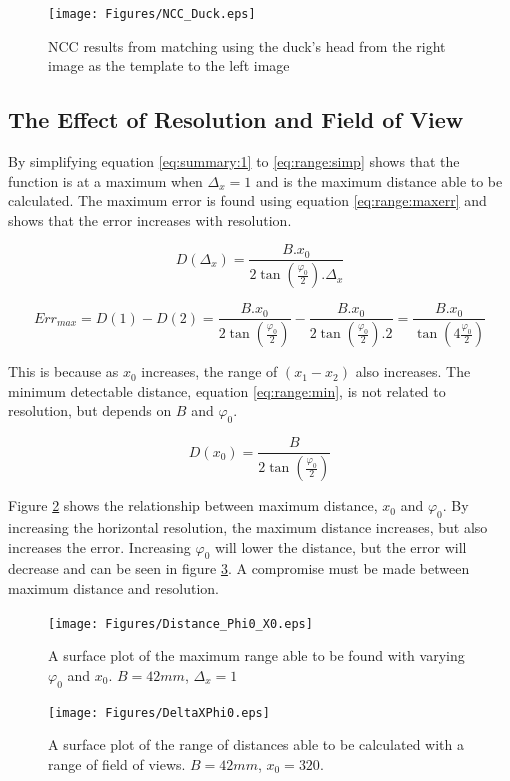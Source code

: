 \begin{figure}
\texttt{[image: Figures/NCC\_Duck.eps]}
\caption{NCC results from matching using the duck's head from the right image as the template to the left image}
\label{fig:duck:ncc}
\end{figure}


\subsection{The Effect of Resolution and Field of View}

By simplifying equation \eqref{eq:summary:1} to \eqref{eq:range:simp} shows that the function is at a maximum when $\Delta_x = 1$ and is the maximum distance able to be calculated. The maximum error is found using equation \eqref{eq:range:maxerr} and shows that the error increases with resolution. 

\begin{equation}\label{eq:range:simp}
D(\Delta_x) = \frac{B.x_0}{2\tan \left(\frac{\varphi_0}{2}\right).\Delta_x}
\end{equation}

\begin{equation}\label{eq:range:maxerr}
Err_{max} = D(1) - D(2) = \frac{B.x_0}{2\tan \left(\frac{\varphi_0}{2}\right)} - \frac{B.x_0}{2\tan \left(\frac{\varphi_0}{2}\right).2} = \frac{B.x_0}{\tan \left(4\frac{\varphi_0}{2}\right)}
\end{equation}

This is because as $x_0$ increases, the range of $(x_1 - x_2)$ also increases. The minimum detectable distance, equation \eqref{eq:range:min}, is not related to resolution, but depends on $B$ and $\varphi_0$. 

\begin{equation}\label{eq:range:min}
D(x_0) = \frac{B}{2\tan \left(\frac{\varphi_0}{2}\right)}
\end{equation}

Figure \ref{fig:MaxR} shows the relationship between maximum distance, $x_0$ and $\varphi_0$. By increasing the horizontal resolution, the maximum distance increases, but also increases the error. Increasing $\varphi_0$ will lower the distance, but the error will decrease and can be seen in figure \ref{fig:DeltaxPhi0}. A compromise must be made between maximum distance and resolution.

\begin{figure}
\texttt{[image: Figures/Distance\_Phi0\_X0.eps]}
\caption{A surface plot of the maximum range able to be found with varying $\varphi_0$ and $x_0$. $B=42mm$, $\Delta_x = 1$}
\label{fig:MaxR}
\end{figure}
\begin{figure}
\texttt{[image: Figures/DeltaXPhi0.eps]}
\caption{A surface plot of the range of distances able to be calculated with a range of field of views. $B=42mm$, $x_0 = 320$.}
\label{fig:DeltaxPhi0}
\end{figure}

